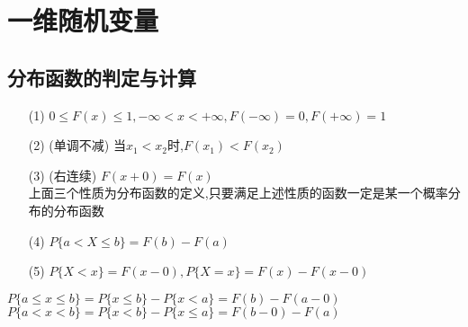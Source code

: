 \documentclass[12pt, a4paper, oneside, UTF8]{ctexbook}
\begin{document}
% 
\else
\fi

\chapter{一维随机变量}

\section{分布函数的判定与计算}
\begin{remark}[分布函数的性质]
    \begin{enumerate}
    \item [(1)] $0\leq F(x)\leq 1, -\infty < x < +\infty, F(-\infty) = 0, F(+\infty)=1$ 
    \item [(2)] (单调不减) 当$x_1 < x_2$时,$F(x_1)<F(x_2)$ 
    \item [(3)] (右连续) $F(x+0)=F(x)$ \\
    上面三个性质为分布函数的定义,只要满足上述性质的函数一定是某一个概率分布的分布函数
    \item [(4)] $P\{a<X\leq b\}=F(b)-F(a)$
    \item [(5)] $P\{X<x\}=F(x-0), P\{X=x\}=F(x)-F(x-0)$
    \end{enumerate}
    $P\{a\leq x\leq b\}=P\{x\leq b\}-P\{x<a\}=F(b)-F(a-0)$ \\
    $P\{a<x<b\}=P\{x<b\}-P\{x\leq a\}=F(b-0)-F(a)$
\end{remark}
\end{document}
